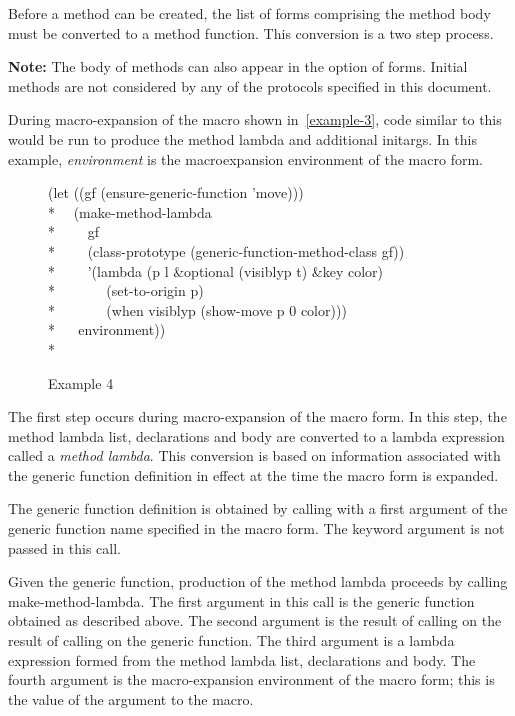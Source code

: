 Before a method can be created, the list of forms comprising the method body
must be converted to a method function. This conversion is a two step process.

\textbf{Note:} The body of methods can also appear in the 
option of  forms. Initial methods are not considered by any of the
protocols specified in this document.

During macro-expansion of the  macro shown in~\ref{example-3}, code
similar to this would be run to produce the method lambda and additional
initargs.  In this example, \emph{environment} is the macroexpansion environment
of the  macro form.

\begin{figure}
\caption{Example 4}
\label{example-4}
\begin{lisp}
(let ((gf (ensure-generic-function 'move)))\\*
~~(make-method-lambda\\*
~~~~gf\\*
~~~~(class-prototype (generic-function-method-class gf))\\*
~~~~'(lambda (p l \&optional (visiblyp t) \&key color)\\*
~~~~~~ (set-to-origin p)\\*
~~~~~~ (when visiblyp (show-move p 0 color)))\\*
~~ environment))\\*
\end{lisp}
\end{figure} 

The first step occurs during macro-expansion of the macro form. In this step,
the method lambda list, declarations and body are converted to a lambda
expression called a \emph{method lambda}. This conversion is based on information
associated with the generic function definition in effect at the time the macro
form is expanded. 

The generic function definition is obtained by calling
 with a first argument of the generic function name
specified in the macro form. The  keyword argument is not
passed in this call.

Given the generic function, production of the method lambda proceeds by calling
make-method-lambda. The first argument in this call is the generic function
obtained as described above. The second argument is the result of calling
 on the result of calling
 on the generic function. The third argument
is a lambda expression formed from the method lambda list, declarations and
body. The fourth argument is the macro-expansion environment of the macro form;
this is the value of the  argument to the 
macro.

